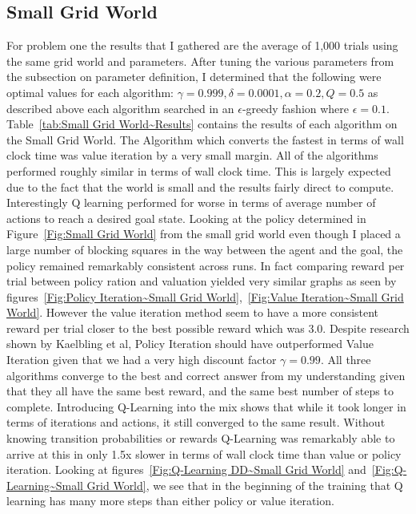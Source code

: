 \documentclass[11pt]{article}
\newcommand{\problemone}{Small Grid World}
\begin{document}
    \subsection{\problemone}
    For problem one the results that I gathered are the average of 1,000 trials using the same grid world and parameters.
    After tuning the various parameters from the subsection on parameter definition, I determined that the following were optimal
    values for each algorithm: $\gamma = 0.999, \delta = 0.0001, \alpha = 0.2, Q = 0.5$ as described above each algorithm
    searched in an $\epsilon$-greedy fashion where $\epsilon = 0.1$.
    Table~\ref{tab:\problemone~Results} contains the results of each algorithm on the \problemone.
    The Algorithm which converts the fastest in terms of wall clock time was value iteration by a very small margin.
    All of the algorithms performed roughly similar in terms of wall clock time.
    This is largely expected due to the fact that the world is small and the results fairly direct to compute.
    Interestingly Q learning performed for worse in terms of average number of actions to reach a desired goal state.
    Looking at the policy determined in Figure~\ref{Fig:Small Grid World} from the small grid world even though I placed
    a large number of blocking squares in the way between the agent and the goal, the policy remained remarkably consistent across runs.
    In fact comparing reward per trial between policy ration and valuation yielded very similar graphs as seen by figures~\ref{Fig:Policy Iteration~\problemone},~\ref{Fig:Value Iteration~\problemone}.
    However the value iteration method seem to have a more consistent reward per trial closer to the best possible reward which was 3.0.
    Despite research shown by Kaelbling et al, Policy Iteration should have outperformed Value Iteration given that we had
    a very high discount factor $\gamma = 0.99$.\cite{Kaelbling1996}
    All three algorithms converge to the best and correct answer from my understanding given that they all have the same
    best reward, and the same best number of steps to complete.
    Introducing Q-Learning into the mix shows that while it took longer in terms of iterations and actions,
    it still converged to the same result.
    Without knowing transition probabilities or rewards Q-Learning was remarkably able to arrive at this in only 1.5x
    slower in terms of wall clock time than value or policy iteration.
    Looking at figures~\ref{Fig:Q-Learning DD~\problemone} and~\ref{Fig:Q-Learning~\problemone}, we see that in the
    beginning of the training that Q learning has many more steps than either policy or value iteration.
\end{document}
